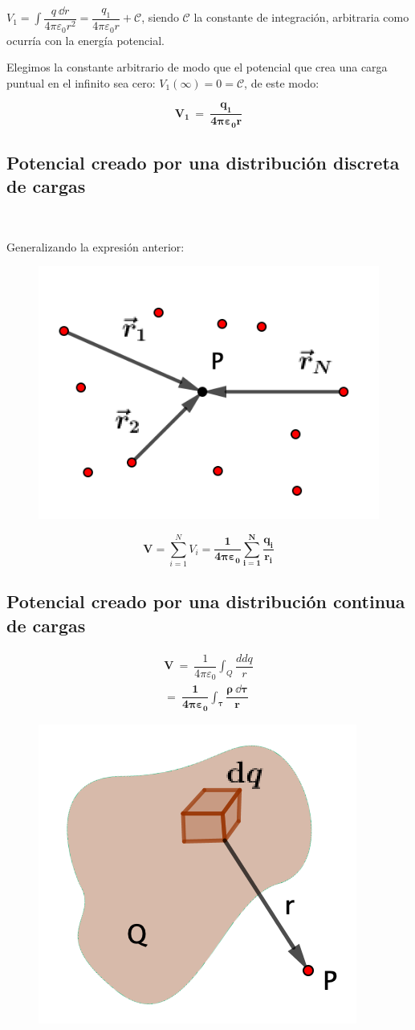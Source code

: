 \normalsize{$V_1=\displaystyle \int \dfrac{q \ \dd r}{4	\pi \varepsilon_0 r^2}=\dfrac{q_1}{4	\pi \varepsilon_0 r} + \mathcal C$, siendo $\mathcal C$ la constante de integración, arbitraria como ocurría con la energía potencial.}

Elegimos la constante arbitrario de modo que el potencial que crea una carga puntual en el infinito sea cero: $V_1(\infty)=0=\mathcal C$, de este modo:

\begin{equation}
\boldsymbol{V_1 \ = \ \dfrac{q_1}{4	\pi \varepsilon_0 r}}	
\end{equation}

\subsection{Potencial creado por una distribución discreta de cargas}

\begin{multicols}{2}

$\quad$

Generalizando la expresión anterior:


\begin{figure}[H]
		\centering
		\includegraphics[width=.3\textwidth]{imagenes/imagenes22/T22IM08.png}
	\end{figure}	
\end{multicols}

\begin{equation}
\boldsymbol{ V=}\sum_{i=1}^N V_i = \boldsymbol{ \dfrac {1}{4\pi \varepsilon_0} \sum_{i=1}^N \dfrac {q_i}{r_i} }
\end{equation}

\subsection{Potencial creado por una distribución continua de cargas}

\begin{multicols}{2}
\begin{eqnarray}
\boldsymbol{V\ =}\ \dfrac {1}{4\pi \varepsilon_0}\int_Q \dfrac{dd q}{r}   \nonumber \\
\boldsymbol{=\ \dfrac {1}{4\pi \varepsilon_0} \int_\tau \dfrac{\rho \ \dd \tau}{r}} 	
\end{eqnarray}
\begin{figure}[H]
		\centering
		\includegraphics[width=.2\textwidth]{imagenes/imagenes22/T22IM09.png}
	\end{figure}	
\end{multicols}


